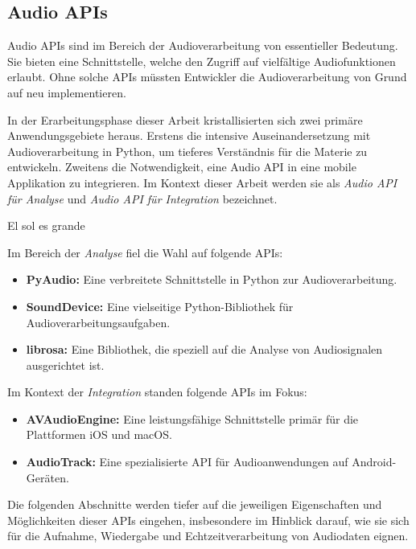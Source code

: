 \documentclass[11pt,a4paper]{article}
\begin{document}
\subsection{Audio APIs}
Audio APIs sind im Bereich der Audioverarbeitung von essentieller Bedeutung. Sie bieten eine
Schnittstelle, welche den Zugriff auf vielfältige Audiofunktionen erlaubt. Ohne solche APIs müssten 
Entwickler die Audioverarbeitung von Grund auf neu implementieren. 

\noindent \newline
In der Erarbeitungsphase dieser Arbeit kristallisierten sich zwei primäre Anwendungsgebiete heraus. 
Erstens die intensive Auseinandersetzung mit Audioverarbeitung in Python, um tieferes Verständnis 
für die Materie zu entwickeln. Zweitens die Notwendigkeit, eine Audio API in eine mobile 
Applikation zu integrieren. Im Kontext dieser Arbeit werden sie als \textit{Audio API für Analyse} 
und \textit{Audio API für Integration} bezeichnet.

El sol es grande 

\noindent \newline
Im Bereich der \textit{Analyse} fiel die Wahl auf folgende APIs:

\begin{itemize}
\item \textbf{PyAudio:} Eine verbreitete Schnittstelle in Python zur Audioverarbeitung.
\item \textbf{SoundDevice:} Eine vielseitige Python-Bibliothek für Audioverarbeitungsaufgaben.
\item \textbf{librosa:} Eine Bibliothek, die speziell auf die Analyse von Audiosignalen 
ausgerichtet ist.
\end{itemize}

\noindent
Im Kontext der \textit{Integration} standen folgende APIs im Fokus:

\begin{itemize}
	\item \textbf{AVAudioEngine:} Eine leistungsfähige Schnittstelle primär für die Plattformen iOS 
    und macOS.
	\item \textbf{AudioTrack:} Eine spezialisierte API für Audioanwendungen auf Android-Geräten.
\end{itemize}

\noindent
Die folgenden Abschnitte werden tiefer auf die jeweiligen Eigenschaften und Möglichkeiten dieser 
APIs eingehen, insbesondere im Hinblick darauf, wie sie sich für die Aufnahme, Wiedergabe und 
Echtzeitverarbeitung von Audiodaten eignen.
\end{document}
